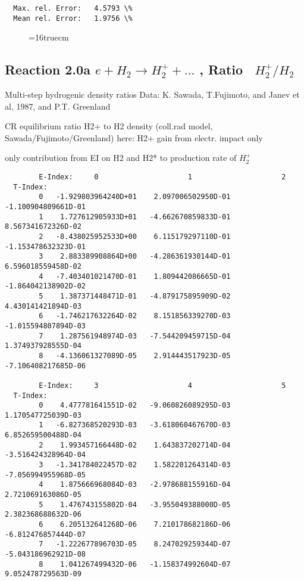 \documentclass[12pt,dvipdfmx]{article}
\begin{document}
{\begin{small}
\begin{verbatim}
  Max. rel. Error:   4.5793 \%
  Mean rel. Error:   1.9756 \%

\end{verbatim}\end{small}
\begin{figure} \label{7.2e}
\epsfxsize=16truecm
\end{figure}
\newpage

\subsection{
Reaction 2.0a  $e + H_2 \rightarrow H_2^+ + ... $ , Ratio \ $H_2^+/H_2$
}

 Multi-step hydrogenic density ratios
 Data: K. Sawada, T.Fujimoto, \cite{kn:Sawada} and Janev et al, 1987, and P.T. Greenland


  CR equilibrium ratio H2+ to H2 density
  (coll.rad model, Sawada/Fujimoto/Greenland)
 here:  H2+ gain from electr. impact only

  only contribution from  EI on H2 and H2* to production rate of $H_2^+$


\begin{small}\begin{verbatim}
        E-Index:     0                     1                     2
  T-Index:
        0   -1.929803964240D+01    2.097006502950D-01   -1.100904809661D-01
        1    1.727612905933D+01   -4.662670859833D-01    8.567341672326D-02
        2   -8.438025952533D+00    6.115179297110D-01   -1.153478632323D-01
        3    2.883389908864D+00   -4.286361930144D-01    6.596018559458D-02
        4   -7.403401021470D-01    1.809442086665D-01   -1.864042138902D-02
        5    1.387371448471D-01   -4.879175895909D-02    4.430141421894D-03
        6   -1.746217632264D-02    8.151856339270D-03   -1.015594807894D-03
        7    1.287561948974D-03   -7.544209459715D-04    1.374937928555D-04
        8   -4.136061327089D-05    2.914443517923D-05   -7.106408217685D-06

        E-Index:     3                     4                     5
  T-Index:
        0    4.477781641551D-02   -9.060826089295D-03    1.170547725039D-03
        1   -6.827368520293D-03   -3.618060467670D-03    6.852659500488D-04
        2    1.993457166448D-02    1.643837202714D-04   -3.516424328964D-04
        3   -1.341784022457D-02    1.582201264314D-03   -7.056994955968D-05
        4    1.875666968084D-03   -2.978688155916D-04    2.721069163086D-05
        5    1.476743155802D-04   -3.955049388000D-05    2.382368688632D-06
        6    6.205132641268D-06    7.210178682186D-06   -6.812476857444D-07
        7   -1.222677896703D-05    8.247029259344D-07   -5.043186962921D-08
        8    1.041267499432D-06   -1.158374992604D-07    9.052478729563D-09


\end{verbatim}
\end{small}}
\end{document}
